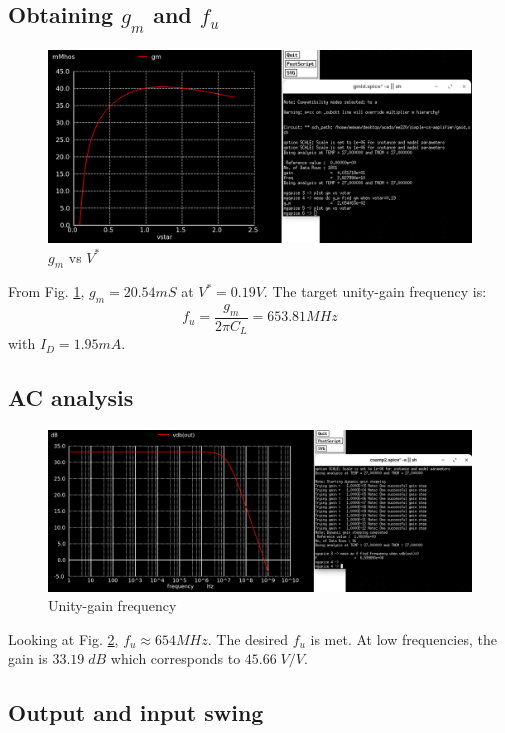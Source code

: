 \documentclass[conference]{IEEEtran}
\begin{document}
\subsection{Obtaining $g_m$ and $f_u$}
\begin{figure}[H]
	\centering 
	\includegraphics[width=\columnwidth]{gm-vstar.png}
	\caption{$g_m$ vs $V^*$}
	\label{gm-vstar}	
\end{figure}
From Fig. \ref{gm-vstar}, $g_m=20.54mS$ at $V^*=0.19V$. The target unity-gain frequency is:
\begin{equation*}
	f_u = \frac{g_m}{2\pi C_L} = 653.81MHz
\end{equation*}
with $I_D=1.95mA$. 
\subsection{AC analysis}
\begin{figure}[H]
	\centering 
	\includegraphics[width=\columnwidth]{fumax.png}
	\caption{Unity-gain frequency}
	\label{fu-vstar}	
\end{figure}
Looking at Fig. \ref{fu-vstar}, $f_u \approx 654MHz$. The desired $f_u$ is met. At low frequencies, the gain is $33.19\; dB$ which corresponds to $45.66\; V/V$.
\subsection{Output and input swing}
\end{document}
